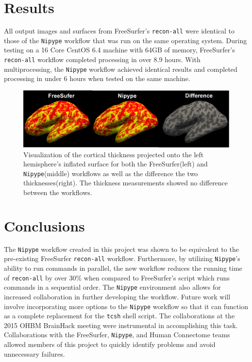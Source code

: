 \documentclass[twocolumn]{bmcart}%
\begin{document}
\section{Results}\label{results}

All output images and surfaces from FreeSurfer's \texttt{recon-all} were identical to those of the \texttt{Nipype} workflow that was run on the same operating system.
During testing on a 16 Core CentOS 6.4 machine with 64GB of memory, FreeSurfer's \texttt{recon-all} workflow completed processing in over 8.9 hours. With multiprocessing, the \texttt{Nipype} workflow achieved identical results and completed processing in under 6 hours when tested on the same machine.

\begin{figure}[h]
\centering
\includegraphics[width=.45\textwidth]{FS6NipypeDiff.png}
\caption{Visualization of the cortical thickness projected onto the left hemisphere's inflated surface for both the FreeSurfer(left) and \texttt{Nipype}(middle) workflows as well as the difference the two thicknesses(right). The thickness measurements showed no difference between the workflows.}
\end{figure}
%
%

\section{Conclusions}\label{conclusions}

The \texttt{Nipype} workflow created in this project was shown to be equivalent to the pre-existing FreeSurfer \texttt{recon-all} workflow. 
Furthermore, by utilizing \texttt{Nipype}'s ability to run commands in parallel, the new workflow reduces the running time of \texttt{recon-all} by over 30\% when compared to FreeSurfer's  script which runs commands in a sequential order. The \texttt{Nipype} environment also allows for increased collaboration in further developing the workflow. 
Future work will involve incorporating more options to the \texttt{Nipype} workflow so that it can function as a complete replacement for the \texttt{tcsh} shell script. 
The collaborations at the 2015 OHBM BrainHack meeting were instrumental in accomplishing this task. 
Collaborations with the FreeSurfer, \texttt{Nipype}, and Human Connectome teams allowed members of this project to quickly identify problems and avoid unnecessary failures.
\end{document}
